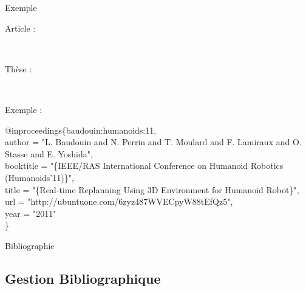 \documentclass{beamer}
\begin{document}
\begin{frame}{Exemple}

Article :\\
\begin{scriptsize}
\mbox{
\citeauthor{baudouin:humanoids:11}
\cite{baudouin:humanoids:11}
}
\end{scriptsize}

Thèse :\\
\begin{scriptsize}
\mbox{
\citeauthor{Courbon09PhD}
\cite{Courbon09PhD}}
\end{scriptsize}
\vspace{5mm}


Exemple :\\
\begin{scriptsize}
@inproceedings\{baudouin:humanoids:11,\\
	\hspace{5mm} author = "L. Baudouin and N. Perrin and T. Moulard and F. Lamiraux and O. Stasse and E. Yoshida",\\
	\hspace{5mm} booktitle = "\{IEEE/RAS International Conference on Humanoid Robotics (Humanoids'11)\}",\\
	\hspace{5mm} title = "\{Real-time Replanning Using 3D Environment for Humanoid Robot\}",\\
	\hspace{5mm} url = "http://ubuntuone.com/6zyz487WVECpyW88tEfQz5",\\
	\hspace{5mm} year = "2011"\\
\}
\end{scriptsize}

\end{frame}

\begin{frame}{Bibliographie}
\printbibliography
\end{frame}


\subsection*{Gestion Bibliographique}
\end{document}
